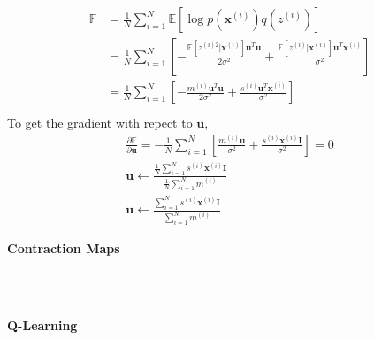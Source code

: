 \documentclass{myhw}
\begin{document}
\begin{homeworkProblem}
\begin{homeworkSection}
\begin{gather*}
\begin{aligned}
\mathbb{F} &= \frac{1}{N} \sum_{i=1}^N \mathbb{E}
[\log p(\bm{x}^{(i)})q(z^{(i)})] \\
&= \frac{1}{N} \sum_{i=1}^N [-\frac{\mathbb{E} [z^{(i)2}|\bm{x}^{(i)}] \bm{u}^T\bm{u}}{2\sigma^2} 
+ \frac{\mathbb{E} [z^{(i)}|\bm{x}^{(i)}] \bm{u}^T \bm{x}^{(i)} }{\sigma^2}] \\
&= \frac{1}{N} \sum_{i=1}^N [-\frac{ m^{(i)} \bm{u}^T\bm{u}}{2\sigma^2} 
+ \frac{ s^{(i)} \bm{u}^T\bm{x}^{(i)}}{\sigma^2}] \\
\end{aligned}
\end{gather*}
To get the gradient with repect to $\bm{u}$,
\begin{gather*}
\frac{\partial \mathbb{F}}{\partial \bm{u}} = 
-\frac{1}{N} \sum_{i=1}^N [\frac{m^{(i)} \bm{u}}{\sigma^2} + \frac{s^{(i)} \bm{x}^{(i)} \bm{I}}{\sigma^2}] = 0 \\
\bm{u} \leftarrow \frac{\frac{1}{N} \sum_{i=1}^N s^{(i)} \bm{x}^{(i)} \bm{I} }{\frac{1}{N} \sum_{i=1}^N m^{(i)}} \\
\bm{u} \leftarrow \frac{\sum_{i=1}^N s^{(i)} \bm{x}^{(i)} \bm{I} }{\sum_{i=1}^N m^{(i)}}
\end{gather*}
\end{homeworkSection}
\end{homeworkProblem}


\begin{homeworkProblem}
\textbf{Contraction Maps}
\begin{homeworkSection}
\emph{} \\
\\
\end{homeworkSection}
\end{homeworkProblem}


\begin{homeworkProblem}
\textbf{Q-Learning}
\begin{homeworkSection}	
\emph{} \\
\\
\end{homeworkSection}
\begin{homeworkSection}	
\emph{} \\
\\
\end{homeworkSection}
\end{homeworkProblem}
\end{document}
